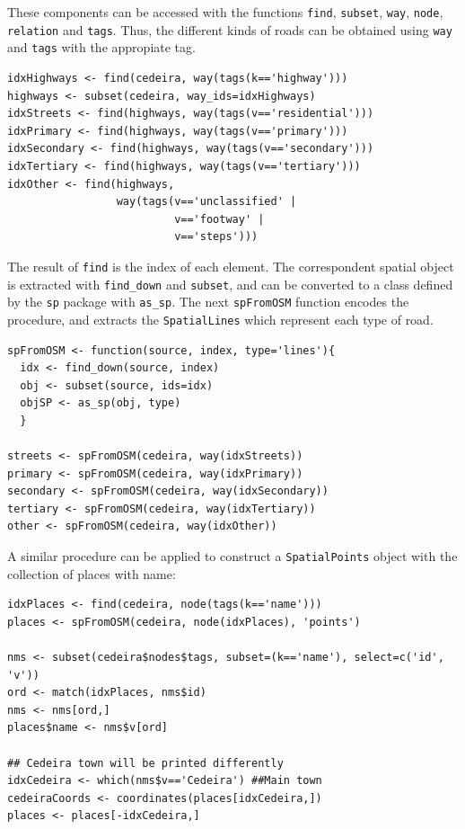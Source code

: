 These components can be accessed with the functions \texttt{find}, \texttt{subset}, \texttt{way},
\texttt{node}, \texttt{relation} and \texttt{tags}. Thus, the different kinds of roads
can be obtained using \texttt{way} and \texttt{tags} with the appropiate
tag. 


\lstset{language=R}
\begin{lstlisting}
idxHighways <- find(cedeira, way(tags(k=='highway')))
highways <- subset(cedeira, way_ids=idxHighways)
idxStreets <- find(highways, way(tags(v=='residential')))
idxPrimary <- find(highways, way(tags(v=='primary')))
idxSecondary <- find(highways, way(tags(v=='secondary')))
idxTertiary <- find(highways, way(tags(v=='tertiary')))
idxOther <- find(highways,
                 way(tags(v=='unclassified' |
                          v=='footway' |
                          v=='steps')))
\end{lstlisting}

The result of \texttt{find} is the index of each element. The
correspondent spatial object is extracted with \texttt{find\_down} and
\texttt{subset}, and can be converted to a class defined by the \texttt{sp}
package with \texttt{as\_sp}. The next \texttt{spFromOSM} function encodes the
procedure, and extracts the \texttt{SpatialLines} which represent each
type of road.


\lstset{language=R}
\begin{lstlisting}
spFromOSM <- function(source, index, type='lines'){
  idx <- find_down(source, index)
  obj <- subset(source, ids=idx)
  objSP <- as_sp(obj, type)
  }

streets <- spFromOSM(cedeira, way(idxStreets))
primary <- spFromOSM(cedeira, way(idxPrimary))
secondary <- spFromOSM(cedeira, way(idxSecondary))
tertiary <- spFromOSM(cedeira, way(idxTertiary))
other <- spFromOSM(cedeira, way(idxOther))
\end{lstlisting}
  
A similar procedure can be applied to construct a \texttt{SpatialPoints}
object with the collection of places with name:


\lstset{language=R}
\begin{lstlisting}
idxPlaces <- find(cedeira, node(tags(k=='name')))
places <- spFromOSM(cedeira, node(idxPlaces), 'points')

nms <- subset(cedeira$nodes$tags, subset=(k=='name'), select=c('id', 'v'))
ord <- match(idxPlaces, nms$id)
nms <- nms[ord,]
places$name <- nms$v[ord]

## Cedeira town will be printed differently
idxCedeira <- which(nms$v=='Cedeira') ##Main town
cedeiraCoords <- coordinates(places[idxCedeira,])
places <- places[-idxCedeira,]
\end{lstlisting}

